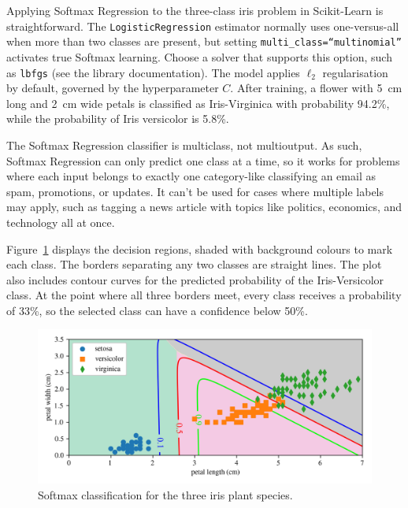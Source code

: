 \documentclass[12pt,letter]{article}
\begin{document}
Applying Softmax Regression to the three-class iris problem in Scikit-Learn is straightforward. The \texttt{LogisticRegression} estimator normally uses one-versus-all when more than two classes are present, but setting \texttt{multi\_class=``multinomial''} activates true Softmax learning. Choose a solver that supports this option, such as \texttt{lbfgs} (see the library documentation). The model applies $\ell_{2}$ regularisation by default, governed by the hyperparameter $C$. After training, a flower with 5~cm long and 2~cm wide petals is classified as Iris-Virginica with probability 94.2\%, while the probability of Iris versicolor is 5.8\%.


\begin{mdframed}[middlelinewidth=0.5mm]
\begin{center}
\end{center}
The Softmax Regression classifier is multiclass, not multioutput. As such, Softmax Regression can only predict one class at a time, so it works for problems where each input belongs to exactly one category-like classifying an email as spam, promotions, or updates. It can't be used for cases where multiple labels may apply, such as tagging a news article with topics like politics, economics, and technology all at once.
\end{mdframed}


Figure~\ref{fig:Softmax_classification} displays the decision regions, shaded with background colours to mark each class. The borders separating any two classes are straight lines. The plot also includes contour curves for the predicted probability of the Iris-Versicolor class. At the point where all three borders meet, every class receives a probability of 33\%, so the selected class can have a confidence below 50\%.


\begin{figure}[H]
	\centering
	\includegraphics[width=5.5in]{../figures/Softmax_classification.png}
	\caption{Softmax classification for the three iris plant species.}
	\label{fig:Softmax_classification}
\end{figure}
\end{document}
